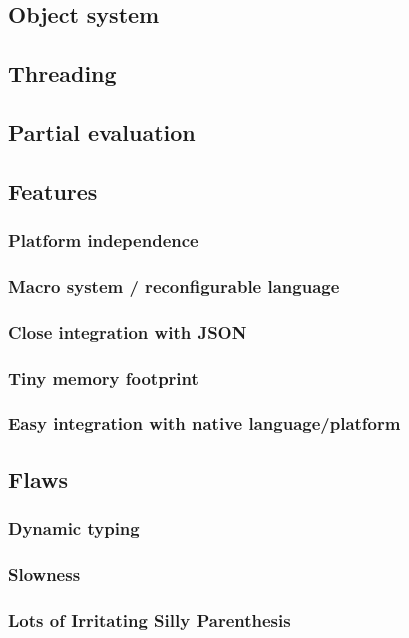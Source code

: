 \subsection{Object system}
\subsection{Threading}
\subsection{Partial evaluation}
\subsection{Features}
\subsubsection{Platform independence}
\subsubsection{Macro system / reconfigurable language}
\subsubsection{Close integration with JSON}
\subsubsection{Tiny memory footprint}
\subsubsection{Easy integration with native language/platform}

\subsection{Flaws}
\subsubsection{Dynamic typing}
\subsubsection{Slowness}
\subsubsection{Lots of Irritating Silly Parenthesis}

